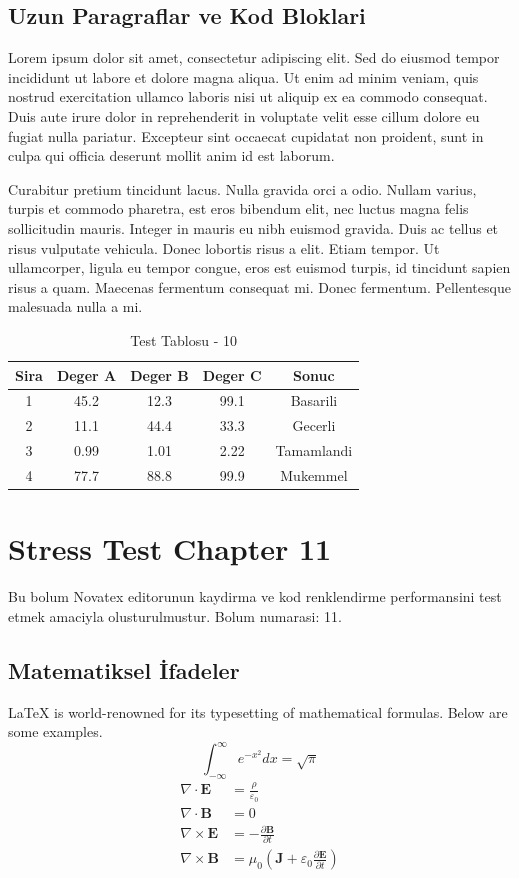 \documentclass[12pt,a4paper]{article}
\begin{document}
\subsection{Uzun Paragraflar ve Kod Bloklari}
Lorem ipsum dolor sit amet, consectetur adipiscing elit. Sed do eiusmod tempor incididunt ut labore et dolore magna aliqua. Ut enim ad minim veniam, quis nostrud exercitation ullamco laboris nisi ut aliquip ex ea commodo consequat. Duis aute irure dolor in reprehenderit in voluptate velit esse cillum dolore eu fugiat nulla pariatur. Excepteur sint occaecat cupidatat non proident, sunt in culpa qui officia deserunt mollit anim id est laborum.

Curabitur pretium tincidunt lacus. Nulla gravida orci a odio. Nullam varius, turpis et commodo pharetra, est eros bibendum elit, nec luctus magna felis sollicitudin mauris. Integer in mauris eu nibh euismod gravida. Duis ac tellus et risus vulputate vehicula. Donec lobortis risus a elit. Etiam tempor. Ut ullamcorper, ligula eu tempor congue, eros est euismod turpis, id tincidunt sapien risus a quam. Maecenas fermentum consequat mi. Donec fermentum. Pellentesque malesuada nulla a mi.

\begin{table}[h!]
\centering
\begin{tabular}{|c|c|c|c|c|}
\hline
\textbf{Sira} & \textbf{Deger A} & \textbf{Deger B} & \textbf{Deger C} & \textbf{Sonuc} \\
\hline
1 & 45.2 & 12.3 & 99.1 & Basarili \\
2 & 11.1 & 44.4 & 33.3 & Gecerli \\
3 & 0.99 & 1.01 & 2.22 & Tamamlandi \\
4 & 77.7 & 88.8 & 99.9 & Mukemmel \\
\hline
\end{tabular}
\caption{Test Tablosu - 10}
\end{table}

\newpage
\section{Stress Test Chapter 11}
Bu bolum Novatex editorunun kaydirma ve kod renklendirme performansini test etmek amaciyla olusturulmustur. Bolum numarasi: 11.

\subsection{Matematiksel İfadeler}
\LaTeX{} is world-renowned for its typesetting of mathematical formulas. Below are some examples.
\begin{equation}
\int_{-\infty}^{\infty} e^{-x^2} dx = \sqrt{\pi}
\end{equation}
\begin{align}
\nabla \cdot \mathbf{E} &= \frac{\rho}{\varepsilon_0} \\
\nabla \cdot \mathbf{B} &= 0 \\
\nabla \times \mathbf{E} &= -\frac{\partial \mathbf{B}}{\partial t} \\
\nabla \times \mathbf{B} &= \mu_0\left(\mathbf{J} + \varepsilon_0 \frac{\partial \mathbf{E}}{\partial t}\right)
\end{align}
\end{document}

